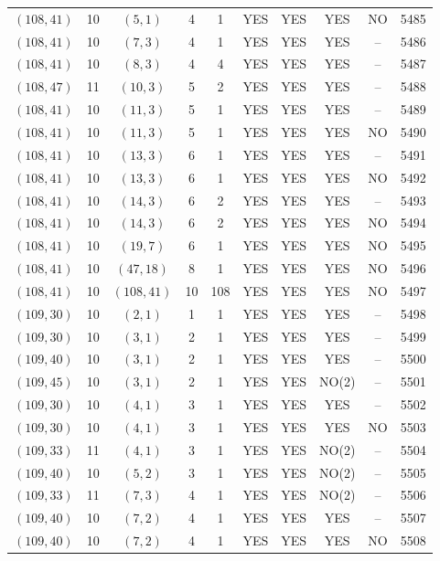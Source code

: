 \begin{longtable}{|c|c|c|c|c|c|c|c|c|c|}
$(108, 41)$ & 10 & $(5, 1)$ & 4 & 1 & YES & YES & YES & NO & 5485\\
$(108, 41)$ & 10 & $(7, 3)$ & 4 & 1 & YES & YES & YES & -- & 5486\\
$(108, 41)$ & 10 & $(8, 3)$ & 4 & 4 & YES & YES & YES & -- & 5487\\
$(108, 47)$ & 11 & $(10, 3)$ & 5 & 2 & YES & YES & YES & -- & 5488\\
$(108, 41)$ & 10 & $(11, 3)$ & 5 & 1 & YES & YES & YES & -- & 5489\\
$(108, 41)$ & 10 & $(11, 3)$ & 5 & 1 & YES & YES & YES & NO & 5490\\
$(108, 41)$ & 10 & $(13, 3)$ & 6 & 1 & YES & YES & YES & -- & 5491\\
$(108, 41)$ & 10 & $(13, 3)$ & 6 & 1 & YES & YES & YES & NO & 5492\\
$(108, 41)$ & 10 & $(14, 3)$ & 6 & 2 & YES & YES & YES & -- & 5493\\
$(108, 41)$ & 10 & $(14, 3)$ & 6 & 2 & YES & YES & YES & NO & 5494\\
$(108, 41)$ & 10 & $(19, 7)$ & 6 & 1 & YES & YES & YES & NO & 5495\\
$(108, 41)$ & 10 & $(47, 18)$ & 8 & 1 & YES & YES & YES & NO & 5496\\
$(108, 41)$ & 10 & $(108, 41)$ & 10 & 108 & YES & YES & YES & NO & 5497\\
$(109, 30)$ & 10 & $(2, 1)$ & 1 & 1 & YES & YES & YES & -- & 5498\\
$(109, 30)$ & 10 & $(3, 1)$ & 2 & 1 & YES & YES & YES & -- & 5499\\
$(109, 40)$ & 10 & $(3, 1)$ & 2 & 1 & YES & YES & YES & -- & 5500\\
$(109, 45)$ & 10 & $(3, 1)$ & 2 & 1 & YES & YES & NO(2) & -- & 5501\\
$(109, 30)$ & 10 & $(4, 1)$ & 3 & 1 & YES & YES & YES & -- & 5502\\
$(109, 30)$ & 10 & $(4, 1)$ & 3 & 1 & YES & YES & YES & NO & 5503\\
$(109, 33)$ & 11 & $(4, 1)$ & 3 & 1 & YES & YES & NO(2) & -- & 5504\\
$(109, 40)$ & 10 & $(5, 2)$ & 3 & 1 & YES & YES & NO(2) & -- & 5505\\
$(109, 33)$ & 11 & $(7, 3)$ & 4 & 1 & YES & YES & NO(2) & -- & 5506\\
$(109, 40)$ & 10 & $(7, 2)$ & 4 & 1 & YES & YES & YES & -- & 5507\\
$(109, 40)$ & 10 & $(7, 2)$ & 4 & 1 & YES & YES & YES & NO & 5508\\

\end{longtable}
